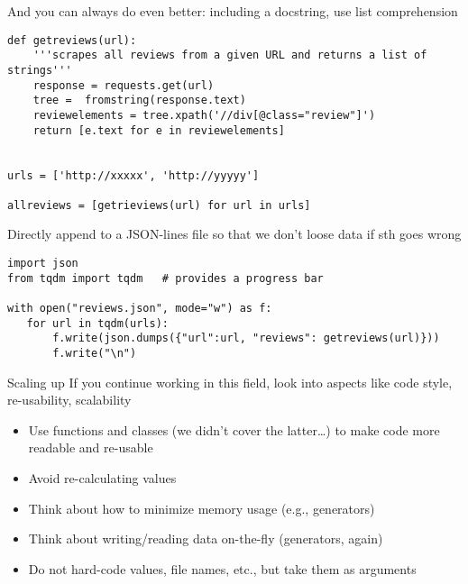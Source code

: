 \documentclass[compress]{beamer}
\begin{document}
\begin{frame}
And you can always do even better: including a docstring, use list comprehension
\begin{verbatim}
def getreviews(url):
    '''scrapes all reviews from a given URL and returns a list of strings'''
    response = requests.get(url)
    tree =  fromstring(response.text)
    reviewelements = tree.xpath('//div[@class="review"]')
    return [e.text for e in reviewelements]


urls = ['http://xxxxx', 'http://yyyyy']

allreviews = [getrieviews(url) for url in urls]
\end{verbatim}
\end{frame}





\begin{frame}
Directly append to a JSON-lines file so that we don't loose data if sth goes wrong
\begin{verbatim}
import json
from tqdm import tqdm   # provides a progress bar

with open("reviews.json", mode="w") as f:
   for url in tqdm(urls):
       f.write(json.dumps({"url":url, "reviews": getreviews(url)}))
       f.write("\n")
\end{verbatim}
\end{frame}




\begin{frame}{Scaling up}
	If you continue working in this field, look into aspects like code style, re-usability, scalability
	\begin{itemize}
		\item Use functions and classes (we didn't cover the latter\ldots) to make code more readable and re-usable
		\item Avoid re-calculating values
		\item Think about how to minimize memory usage (e.g., generators)
		\item Think about writing/reading data on-the-fly (generators, again)
		\item Do not hard-code values, file names, etc., but take them as arguments
	\end{itemize}	
\end{frame}
\end{document}
